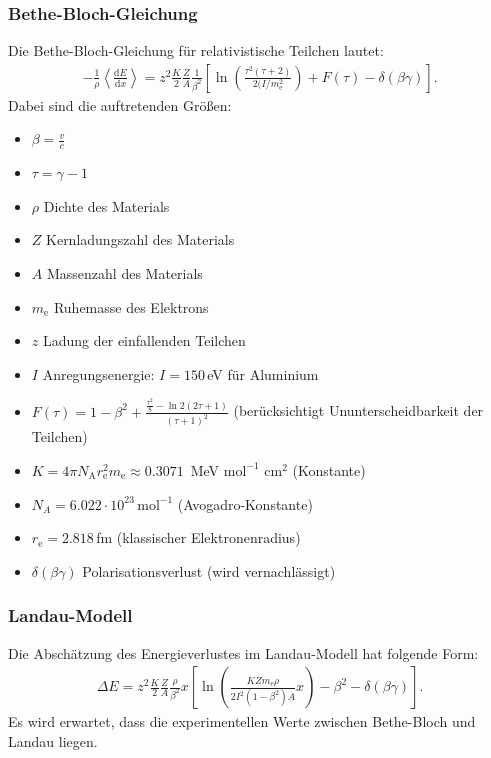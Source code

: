 \documentclass[german,  %
parskip=full,  %
]{scrartcl}
\begin{document}
\subsubsection{Bethe-Bloch-Gleichung}
Die Bethe-Bloch-Gleichung für relativistische Teilchen lautet:
\begin{align*}
- \frac{1}{\rho} \left \langle \frac{\mathrm{d}E}{\mathrm{d} x} \right \rangle=
z^2 \frac{K}{2} \frac{Z}{A} \frac{1}{\beta^2} \left[ \ln \left(\frac{\tau^2(\tau+2)}{2(I/m_{\mathrm{e}}^2}\right)+F(\tau)- \delta(\beta \gamma)\right].
\end{align*}
Dabei sind die auftretenden Größen:
\begin{itemize}
\item $\beta=\frac{v}{c}$
\item $\tau = \gamma -1$
\item $\rho$ Dichte des Materials
\item $Z$ Kernladungszahl des Materials
\item $A$ Massenzahl des Materials
\item $m_{\mathrm{e}}$ Ruhemasse des Elektrons
\item $z$ Ladung der einfallenden Teilchen
\item $I$ Anregungsenergie: $I = 150$\,eV für Aluminium
\item $F(\tau) = 1- \beta^2+\frac{\frac{\tau^2}{8}- \ln 2(2\tau+1)}{(\tau+1)^2}$ (berücksichtigt Ununterscheidbarkeit der Teilchen)
\item $K = 4 \pi N_{\mathrm{A}} r_{\mathrm{e}}^2 m_\mathrm{e} \approx 0.3071$\, MeV $\text{mol}^{-1}$ $\text{cm}^2$ (Konstante)
\item $N_A = 6.022 \cdot 10^{23}$\,$\text{mol}^{-1}$ (Avogadro-Konstante)
\item $r_\mathrm{e} = 2.818$\,fm (klassischer Elektronenradius)
\item $\delta(\beta \gamma)$ Polarisationsverlust (wird vernachlässigt)
\end{itemize}

\subsubsection{Landau-Modell}
Die Abschätzung des Energieverlustes im Landau-Modell hat folgende Form:
\begin{align*}
\Delta E =z^2 \frac{K}{2} \frac{Z}{A} \frac{\rho}{\beta^2}x \left[ \ln \left(\frac{KZm_{\mathrm{e}}\rho}{2I^2(1-\beta^2)A}x\right)- \beta^2- \delta(\beta \gamma)\right].
\end{align*}
Es wird erwartet, dass die experimentellen Werte zwischen Bethe-Bloch und Landau liegen.
\end{document}
